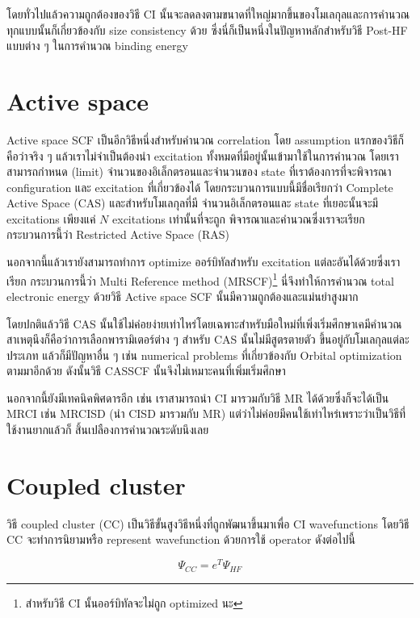 โดยทั่วไปแล้วความถูกต้องของวิธี CI นั้นจะลดลงตามขนาดที่ใหญ่มากขึ้นของโมเลกุลและการคำนวณทุกแบบนั้นก็เกี่ยวข้องกับ
size consistency ด้วย ซึ่งนี่ก็เป็นหนึ่งในปัญหาหลักสำหรับวิธี Post-HF แบบต่าง ๆ ในการคำนวณ binding energy

\section{Active space}

Active space SCF เป็นอีกวิธีหนึ่งสำหรับคำนวณ correlation โดย assumption แรกของวิธีก็คือว่าจริง ๆ
แล้วเราไม่จำเป็นต้องนำ excitation ทั้งหมดที่มีอยู่นั้นเข้ามาใช้ในการคำนวณ โดยเราสามารถกำหนด (limit)
จำนวนของอิเล็กตรอนและจำนวนของ state ที่เราต้องการที่จะพิจารณา configuration และ excitation
ที่เกี่ยวข้องได้ โดยกระบวนการแบบนี้มีชื่อเรียกว่า Complete Active Space (CAS) และสำหรับโมเลกุลที่มี%
จำนวนอิเล็กตรอนและ state ที่เยอะนั้นจะมี excitations เพียงแค่ $N$ excitations เท่านั้นที่จะถูก%
พิจารณาและคำนวณซึ่งเราจะเรียกกระบวนการนี้ว่า Restricted Active Space (RAS)

นอกจากนี้แล้วเรายังสามารถทำการ optimize ออร์บิทัลสำหรับ excitation แต่ละอันได้ด้วยซึ่งเราเรียก%
กระบวนการนี้ว่า Multi Reference method (MRSCF)\footnote{สำหรับวิธี CI นั้นออร์บิทัลจะไม่ถูก
    optimized นะ} นี่จึงทำให้การคำนวณ total electronic energy ด้วยวิธี Active space SCF
นั้นมีความถูกต้องและแม่นยำสูงมาก

โดยปกติแล้ววิธี CAS นั้นใช้ไม่ค่อยง่ายเท่าไหร่โดยเฉพาะสำหรับมือใหม่ที่เพิ่งเริ่มศึกษาเคมีคำนวณ
สาเหตุนึงก็คือว่าการเลือกพารามิเตอร์ต่าง ๆ สำหรับ CAS นั้นไม่มีสูตรตายตัว ขึ้นอยู่กับโมเลกุลแต่ละประเภท
แล้วก็มีปัญหาอื่น ๆ เช่น numerical problems ที่เกี่ยวข้องกับ Orbital optimization ตามมาอีกด้วย
ดังนั้นวิธี CASSCF นั้นจึงไม่เหมาะคนที่เพิ่มเริ่มศึกษา

นอกจากนี้ยังมีเทคนิคพิศดารอีก เช่น เราสามารถนำ CI มารวมกับวิธี MR ได้ด้วยซึ่งก็จะได้เป็น MRCI
เช่น MRCISD (นำ CISD มารวมกับ MR) แต่ว่าไม่ค่อยมีคนใช้เท่าไหร่เพราะว่าเป็นวิธีที่ใช้งานยากแล้วก็%
สิ้นเปลืองการคำนวณระดับนึงเลย

\section{Coupled cluster}

วิธี coupled cluster (CC) เป็นวิธีขั้นสูงวิธีหนึ่งที่ถูกพัฒนาขึ้นมาเพื่อ CI wavefunctions
โดยวิธี CC จะทำการนิยามหรือ represent wavefunction ด้วยการใช้ operator ดังต่อไปนี้

\begin{equation}
    \Psi_{CC} = e^{T} \Psi_{HF}
\end{equation}

